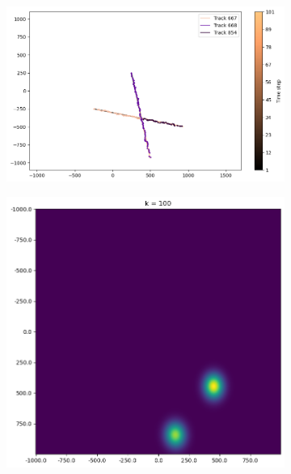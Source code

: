 \begin{figure}
    \centering
    \begin{subfigure}[]{0.48\linewidth}
        \centering
        \includegraphics[width=\linewidth]{figures/c1-traj.png}
    \end{subfigure}
    \hfill
    \begin{subfigure}[]{0.48\linewidth}
        \centering
        \includegraphics[width=\linewidth]{figures/c1-post.png}
    \end{subfigure}

\end{figure}

